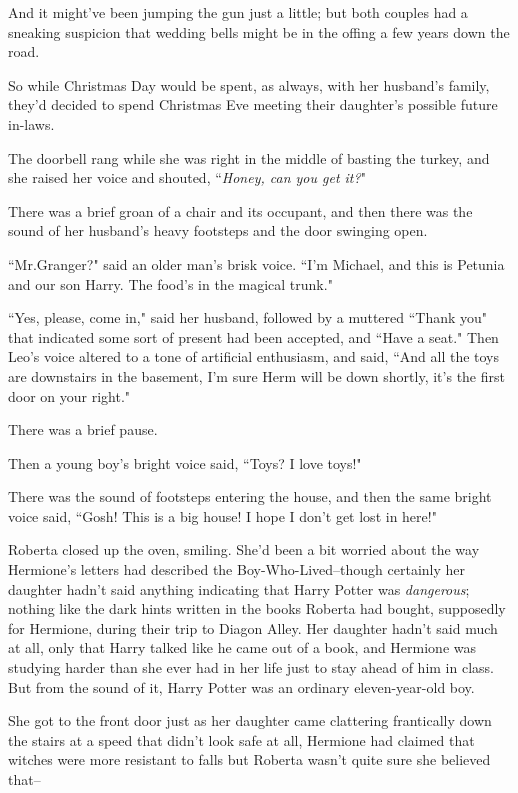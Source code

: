 And it might've been jumping the gun just a little; but both couples had a sneaking suspicion that wedding bells might be in the offing a few years down the road.

So while Christmas Day would be spent, as always, with her husband's family, they'd decided to spend Christmas Eve meeting their daughter's possible future in-laws.

The doorbell rang while she was right in the middle of basting the turkey, and she raised her voice and shouted, ``\emph{Honey, can you get it?}"

There was a brief groan of a chair and its occupant, and then there was the sound of her husband's heavy footsteps and the door swinging open.

``Mr.\?Granger?" said an older man's brisk voice. ``I'm Michael, and this is Petunia and our son Harry. The food's in the magical trunk."

``Yes, please, come in," said her husband, followed by a muttered ``Thank you" that indicated some sort of present had been accepted, and ``Have a seat." Then Leo's voice altered to a tone of artificial enthusiasm, and said, ``And all the toys are downstairs in the basement, I'm sure Herm will be down shortly, it's the first door on your right."

There was a brief pause.

Then a young boy's bright voice said, ``Toys? I love toys!"

There was the sound of footsteps entering the house, and then the same bright voice said, ``Gosh! This is a big house! I hope I don't get lost in here!"

Roberta closed up the oven, smiling. She'd been a bit worried about the way Hermione's letters had described the Boy-Who-Lived\---though certainly her daughter hadn't said anything indicating that Harry Potter was \emph{dangerous}; nothing like the dark hints written in the books Roberta had bought, supposedly for Hermione, during their trip to Diagon Alley. Her daughter hadn't said much at all, only that Harry talked like he came out of a book, and Hermione was studying harder than she ever had in her life just to stay ahead of him in class. But from the sound of it, Harry Potter was an ordinary eleven-year-old boy.

She got to the front door just as her daughter came clattering frantically down the stairs at a speed that didn't look safe at all, Hermione had claimed that witches were more resistant to falls but Roberta wasn't quite sure she believed that\---

